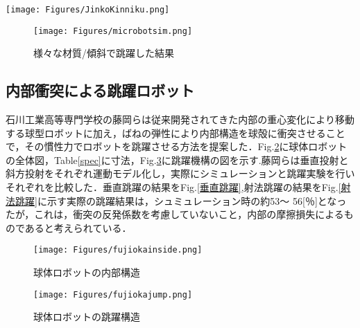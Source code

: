 \documentclass[a4paper,11pt,dvipdfmx.uplatex]{jsarticle}
\begin{document}
\begin{figure*} [htbp]
	\centering
	\texttt{[image: Figures/JinkoKinniku.png]}
	\caption{人工筋肉が跳躍する様子\cite{microbots}}
	\label{kinniku}
\end{figure*}

\begin{figure} [htbp]
	\texttt{[image: Figures/microbotsim.png]}
	\caption{
	    様々な材質/傾斜で跳躍した結果\cite{microbots}}
	\label{microbotsim}
\end{figure}



\subsection{内部衝突による跳躍ロボット}
石川工業高等専門学校の藤岡らは従来開発されてきた内部の重心変化により移動する球型ロボット\cite{越山}\cite{halme}に加え，ばねの弾性により内部構造を球殻に衝突させることで，その慣性力でロボットを跳躍させる方法を提案した．Fig.\ref{内部構造}に球体ロボットの全体図，Table\ref{spec}に寸法，Fig.\ref{跳躍構造}に跳躍機構の図を示す.藤岡らは垂直投射と斜方投射をそれぞれ運動モデル化し，実際にシミュレーションと跳躍実験を行いそれぞれを比較した．垂直跳躍の結果をFig.\ref{垂直跳躍},射法跳躍の結果をFig.\ref{射法跳躍}に示す実際の跳躍結果は，シュミュレーション時の約53～ 56[％]となったが，これは，衝突の反発係数を考慮していないこと，内部の摩擦損失によるものであると考えられている．


\begin{figure} [htbp]
	\texttt{[image: Figures/fujiokainside.png]}
	\caption{
	   球体ロボットの内部構造\cite{藤岡}}
	\label{内部構造}
\end{figure}


\begin{figure} [htbp]
	\texttt{[image: Figures/fujiokajump.png]}
	\caption{球体ロボットの跳躍構造\cite{藤岡}}
	\label{跳躍構造}
\end{figure}

\begin{table}[htbp]
\caption{球体ロボットの寸法\cite{藤岡}}
\centering
\label{spec}
\end{table}
\end{document}
